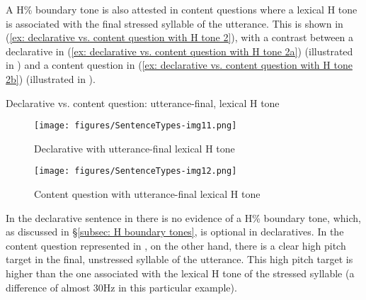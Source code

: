 A H\% boundary tone is also attested in content questions where a lexical H tone is associated with the final stressed syllable of the utterance. This is shown in (\ref{ex: declarative vs. content question with H tone 2}), with a contrast between a declarative in (\ref{ex: declarative vs. content question with H tone 2a}) (illustrated in ) and a content question in (\ref{ex: declarative vs. content question with H tone 2b}) (illustrated in ).

\ea\label{ex: declarative vs. content question with H tone 2}
{Declarative vs. content question: utterance-final, lexical H tone}

 \label{ex: declarative vs. content question with H tone 2a}
        \label{ex: declarative vs. content question with H tone 2b}
    \z
\z

\begin{figure}
\texttt{[image: figures/SentenceTypes-img11.png]}
\caption{
\label{fig: declarative with H tone 2}
Declarative with utterance-final lexical H tone}
\end{figure}

\begin{figure}
\texttt{[image: figures/SentenceTypes-img12.png]}
\caption{
\label{fig: content question lexical H tone 2}
Content question with utterance-final lexical H tone}
\end{figure}

In the declarative sentence in  there is no evidence of a H\% boundary tone, which, as discussed in §\ref{subsec: H boundary tones}, is optional in declaratives. In the content question represented in , on the other hand, there is a clear high pitch target in the final, unstressed syllable of the utterance. This high pitch target is higher than the one associated with the lexical H tone of the stressed syllable (a difference of almost 30Hz in this particular example).

